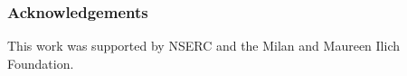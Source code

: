 \subsubsection*{Acknowledgements}
\label{sec:achnowledge}

This work was supported by NSERC and the Milan and Maureen Ilich Foundation.
